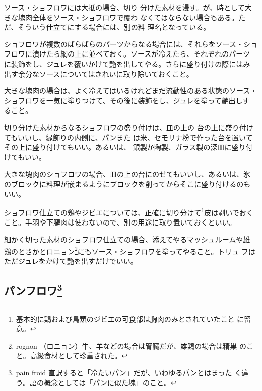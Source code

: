 

\protect\hyperlink{sauce-chaud-froid-ordinaire}{ソース・ショフロワ}には大抵の場合、切り
分けた素材を浸す。が、時として大きな塊肉全体をソース・ショフロワで覆わ
なくてはならない場合もある。ただ、そういう仕立てにする場合には、別の料
理名となっている。

ショフロワが複数のばらばらのパーツからなる場合には、それらをソース・ショ
フロワに漬けたら網の上に並べておく。ソースが冷えたら、それぞれのパーツ
に装飾をし、ジュレを覆いかけて艶を出してやる。さらに盛り付けの際にはみ
出す余分なソースについてはきれいに取り除いておくこと。

大きな塊肉の場合は、よく冷えてはいるけれどまだ流動性のある状態のソース・
ショフロワを一気に塗りつけて、その後に装飾をし、ジュレを塗って艶出しす
ること。

切り分けた素材からなるショフロワの盛り付けは、\protect\hyperlink{fonds-de-plats}{皿の上の
台}の上に盛り付けてもいいし、縁飾りの内側に、パンまた
は米、セモリナ粉で作った台を置いてその上に盛り付けてもいい。あるいは、
銀製か陶製、ガラス製の深皿に盛り付けてもいい。

大きな塊肉のショフロワの場合、皿の上の台にのせてもいいし、あるいは、氷
のブロックに料理が嵌まるようにブロックを削ってからそこに盛り付けるのも
いい。

ショフロワ仕立ての鶏やジビエについては、正確に切り分けて\footnote{基本的に鶏および鳥類のジビエの可食部は胸肉のみとされていたこと
  に留意。}皮は剥いでおく
こと。手羽や下腿肉は使わないので、別の用途に取り置いておくといい。

細かく切った素材のショフロワ仕立ての場合、添えてやるマッシュルームや雄
鶏のとさかとロニョン\footnote{rognon
  （ロニョン）牛、羊などの場合は腎臓だが、雄鶏の場合は精巣
  のこと。高級食材として珍重された。}にもソース・ショフロワを塗ってやること。トリュ
フはただジュレをかけて艶を出すだけでいい。

\hypertarget{pains-froids}{%
\subsection[パンフロワ]{\texorpdfstring{パンフロワ\footnote{pain froid
  直訳すると「冷たいパン」だが、いわゆるパンとはまった
  く違う。語の概念としては「パンに似た塊」のこと。}}{パンフロワ}}\label{pains-froids}}

